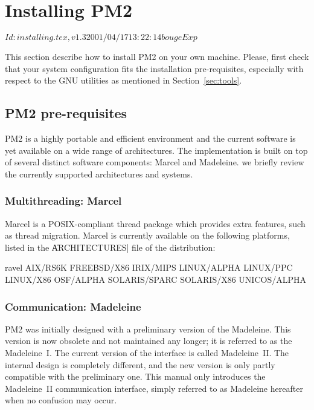 \chapter{Installing PM2}

\stamp $Id: installing.tex,v 1.3 2001/04/17 13:22:14 bouge Exp $

This section describe how to install PM2 on your own machine.
Please, first check that your system configuration fits the
installation pre-requisites, especially with respect to the GNU
utilities as mentioned in Section~\ref{sec:tools}.

\section{PM2 pre-requisites}

PM2 is a highly portable and efficient environment and the current
software is yet available on a wide range of architectures. The
implementation is built on top of several distinct software
components: Marcel and Madeleine. we briefly review the currently
supported architectures and systems. 


\subsection{Multithreading: Marcel}

Marcel is a POSIX-compliant thread package which provides extra
features, such as thread migration.  Marcel is currently available on
the following platforms, listed in the \|ARCHITECTURES| file of the
distribution:
\begin{shell}
ravel%
AIX/RS6K
FREEBSD/X86
IRIX/MIPS
LINUX/ALPHA
LINUX/PPC
LINUX/X86
OSF/ALPHA
SOLARIS/SPARC
SOLARIS/X86
UNICOS/ALPHA
\end{shell}


\subsection{Communication: Madeleine}

PM2 was initially designed with a preliminary version of the
Madeleine. This version is now obsolete and not maintained any longer;
it is referred to as the Madeleine~I. The current version of the
interface is called Madeleine~II. The internal design is completely
different, and the new version is only partly compatible with the
preliminary one. This manual only introduces the Madeleine~II
communication interface, simply referred to as Madeleine hereafter
when no confusion may occur.

